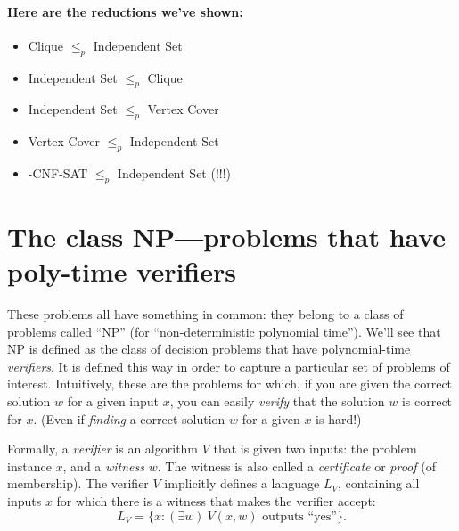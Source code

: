 \documentclass[11pt]{article}
\begin{document}
\begin{restatement}
\paragraph{Here are the reductions we've shown:}
  \begin{itemize}
  \item {\sc Clique} $\le_p$ {\sc Independent Set}
  \item {\sc Independent Set} $\le_p$ {\sc Clique}
  \item {\sc Independent Set} $\le_p$ {\sc Vertex Cover}
  \item {\sc Vertex Cover} $\le_p$ {\sc Independent Set}
  \item {-CNF-SAT} $\le_p$ {\sc Independent Set} (!!!)
  \end{itemize}
\end{restatement}
\setcounter{lemma}{3}

\section{The class NP---problems that have poly-time verifiers}\label{np: sec: NP}
These problems all have something in common:
they belong to a class of problems called
``NP'' (for ``non-deterministic polynomial time'').
We'll see that NP is defined as the class of decision problems
that have polynomial-time \emph{verifiers}.
It is defined this way in order to capture a particular set of problems of interest.
Intuitively, these are the problems for which, if you are given the correct solution $w$
for a given input $x$, you can easily \emph{verify} that the solution $w$ is correct for $x$.
(Even if \emph{finding} a correct solution $w$ for a given $x$ is hard!)

Formally, a \emph{verifier} is an algorithm $V$
that is given two inputs: the problem instance $x$, and a \emph{witness} $w$.
The witness is also called a \emph{certificate} or \emph{proof} (of membership).
The verifier $V$ implicitly defines a language $L_V$,
containing all inputs $x$ for which there is a witness that makes the verifier accept:
\[L_V = \{x : (\exists w)~ V(x, w) \text{ outputs ``yes''}\}.\]
\end{document}
